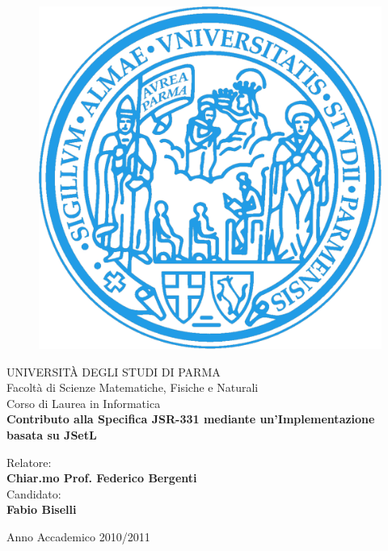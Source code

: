 \documentclass[a4paper, 11pt, oneside]{book}
\author{Fabio Biselli}
\theoremstyle{definition}
\theoremstyle{remark}
\begin{document}
\begin{titlepage}
\begin{figure}
\begin{center}
\includegraphics[scale=0.060]{img/Sigillo.pdf}\\
\end{center}
\end{figure}

\begin{center}
\Large UNIVERSIT\`A DEGLI STUDI DI PARMA\\
Facoltà di Scienze Matematiche, Fisiche e Naturali\\
\bigskip
\Large Corso di Laurea in Informatica\\
\vspace{100pt}
\huge \textbf{Contributo alla Specifica JSR-331 mediante un'Implementazione 
basata su JSetL}
\end{center}
\vspace{120pt}
\large
\begin{flushleft}
Relatore:\\ \textbf{Chiar.mo Prof. Federico Bergenti}\\
\vspace{5pt}
Candidato:\\ \textbf{Fabio Biselli}
\end{flushleft}
\normalsize
\bigskip
\begin{center}
Anno Accademico 2010/2011
\end{center}
\end{titlepage}

\frontmatter
\pagestyle{empty}

\pagestyle{fancy}

\tableofcontents

\mainmatter







\appendix



\backmatter

\end{document}
